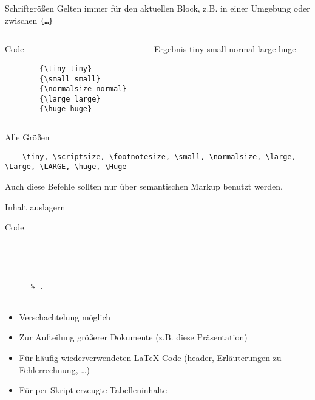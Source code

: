 \begin{frame}[fragile]{Schriftgrößen}
  Gelten immer für den aktuellen Block, z.B. in einer Umgebung oder zwischen \texttt{\{…\}}
  \begin{columns}[onlytextwidth, t]
    \begin{column}{0.48\textwidth}
      \begin{block}{Code}
        \begin{lstlisting}
        {\tiny tiny}
        {\small small}
        {\normalsize normal}
        {\large large}
        {\huge huge}
        \end{lstlisting}
      \end{block}
    \end{column}
    \begin{column}{0.48\textwidth}
      \begin{block}{Ergebnis}
        {\tiny tiny}
        {\small small}
        {\normalsize normal}
        {\large large}
        {\huge huge}
      \end{block}
    \end{column}
  \end{columns}
  \vspace{1em}
  \begin{block}{Alle Größen}
    \begin{lstlisting}
    \tiny, \scriptsize, \footnotesize, \small, \normalsize, \large, \Large, \LARGE, \huge, \Huge
    \end{lstlisting}
  \end{block}
  Auch diese Befehle sollten nur über semantischen Markup benutzt werden.
\end{frame}

\begin{frame}[fragile]{Inhalt auslagern}
  \begin{block}{Code}
    \begin{lstlisting}
    
    
      
      
      % .
    
    \end{lstlisting}
  \end{block}
  \begin{itemize}
    \item Verschachtelung möglich
    \item Zur Aufteilung größerer Dokumente (z.B. diese Präsentation)
    \item Für häufig wiederverwendeten \LaTeX-Code (header, Erläuterungen zu Fehlerrechnung, …)
    \item Für per Skript erzeugte Tabelleninhalte
  \end{itemize}
\end{frame}

